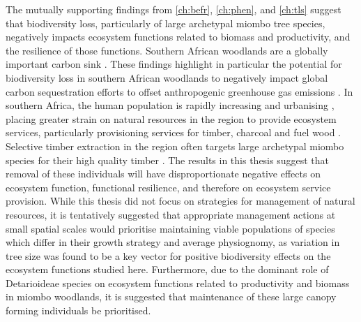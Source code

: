 \begin{refsection}
The mutually supporting findings from \autoref{ch:befr}, \autoref{ch:phen}, and \autoref{ch:tls} suggest that biodiversity loss, particularly of large archetypal miombo tree species, negatively impacts ecosystem functions related to biomass and productivity, and the resilience of those functions. Southern African woodlands are a globally important carbon sink \citep{}. These findings highlight in particular the potential for biodiversity loss in southern African woodlands to negatively impact global carbon sequestration efforts to offset anthropogenic greenhouse gas emissions \citep{}. In southern Africa, the human population is rapidly increasing \citep{} and urbanising \citep{}, placing greater strain on natural resources in the region to provide ecosystem services, particularly provisioning services for timber, charcoal and fuel wood \citep{Ryan2016}. Selective timber extraction in the region often targets large archetypal miombo species for their high quality timber \citep{}. The results in this thesis suggest that removal of these individuals will have disproportionate negative effects on ecosystem function, functional resilience, and therefore on ecosystem service provision. While this thesis did not focus on strategies for management of natural resources, it is tentatively suggested that appropriate management actions at small spatial scales would prioritise maintaining viable populations of species which differ in their growth strategy and average physiognomy, as variation in tree size was found to be a key vector for positive biodiversity effects on the ecosystem functions studied here. Furthermore, due to the dominant role of Detarioideae species on ecosystem functions related to productivity and biomass in miombo woodlands, it is suggested that maintenance of these large canopy forming individuals be prioritised.


\end{refsection}
